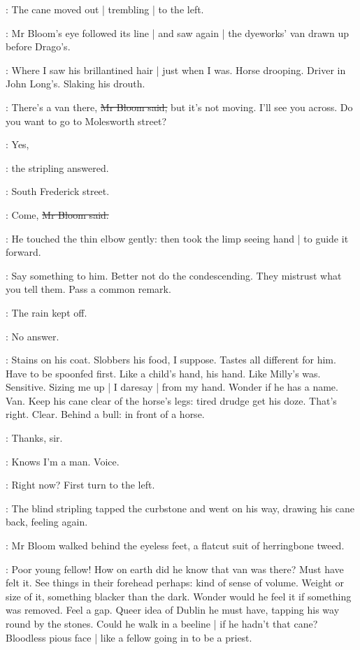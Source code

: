 :
The cane moved out |
trembling |
to the left.

:
Mr Bloom's eye followed its line |
and saw again |
the dyeworks' van drawn up before Drago's.

\BloomInt:
Where I saw his brillantined hair |
just when I was.
Horse drooping.
Driver in John Long's.
Slaking his drouth.

\Bloom:
There's a van there,
\sout{Mr Bloom said,}
but it's not moving.
I'll see you across.
Do you want to go to Molesworth street?

\stripling:
Yes,

:
the stripling answered.

\stripling:
South Frederick street.

\Bloom:
Come,
\sout{Mr Bloom said.}

:
He touched the thin elbow gently:
then took the limp seeing hand |
to guide it forward.

\BloomInt:
Say something to him.
Better not do the condescending.
They mistrust what you tell them.
Pass a common remark.

\Bloom:
The rain kept off.

\BloomInt:
No answer.

\BloomInt:
Stains on his coat.
Slobbers his food, I suppose.
Tastes all different for him.
Have to be spoonfed first.
Like a child's hand, his hand.
Like Milly's was.
Sensitive.
Sizing me up |
I daresay |
from my hand.
Wonder if he has a name.
Van.
Keep his cane clear of the horse's legs:
tired drudge get his doze.
That's right.
Clear.
Behind a bull:
in front of a horse.

\stripling:
Thanks, sir.

\BloomInt:
Knows I'm a man.
Voice.

\Bloom:
Right now?
First turn to the left.

:
The blind stripling tapped the curbstone and went on his way,
drawing his cane back,
feeling again.

:
Mr Bloom walked behind the eyeless feet,
a flatcut suit of herringbone tweed.

\BloomInt:
Poor young fellow!
How on earth did he know that van was there?
Must have felt it.
See things in their forehead perhaps:
kind of sense of volume.
Weight or size of it,
something blacker than the dark.
Wonder would he feel it
if something was removed.
Feel a gap.
Queer idea of Dublin he must have,
tapping his way round by the stones.
Could he walk in a beeline |
if he hadn't that cane?
Bloodless pious face |
like a fellow going in to be a priest.


